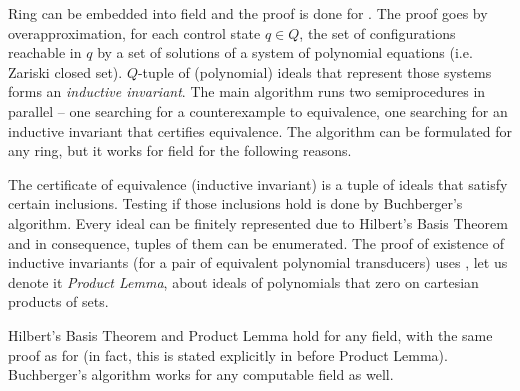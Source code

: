 Ring \Z can be embedded into field \Q and the proof is done for \polTsover{\Q}.
The proof goes by overapproximation, for each control state $q \in Q$, the set of configurations reachable in $q$ by a set of solutions of a system of polynomial equations (i.e. Zariski closed set).
$Q$-tuple of (polynomial) ideals that represent those systems forms an \emph{inductive invariant}.
The main algorithm runs two semiprocedures in parallel -- one searching for a counterexample to equivalence, one searching for an inductive invariant that certifies equivalence. The algorithm can be formulated for any ring, %
but it works for field \Q for the following reasons.

The certificate of equivalence (inductive invariant) is a tuple of ideals that satisfy certain inclusions. Testing if those inclusions hold is done by Buchberger's algorithm. Every ideal can be finitely represented due to Hilbert's Basis Theorem and in consequence, tuples of them can be enumerated.
The proof of existence of inductive invariants (for a pair of equivalent polynomial transducers) uses \cite[Lemma 6.3]{seidlManethKemper2018}, let us denote it \emph{Product Lemma}, about ideals of polynomials that zero on cartesian products of sets.

 Hilbert's Basis Theorem and Product Lemma hold for any field, with the same proof as for \Q (in fact, this is stated explicitly in \cite{seidlManethKemper2018} before Product Lemma). Buchberger's algorithm works for any computable field as well.

